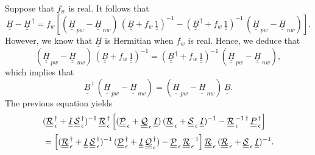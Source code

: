 \documentclass[12pt,prb,aps,notitlepage]{revtex4-1}
\begin{document}
Suppose that $f_w$ is real. It follows that
\begin{equation}
\underline{\underline{H}} -\underline{\underline{H}}^{\,\dag} = 
f_w\left[( \underline{\underline{H}}_{\,pw} - \underline{\underline{H}}_{\,nw} )\,(\underline{\underline{B}}+f_w\,\underline{\underline{1}})^{-1}- (\underline{\underline{B}}^{\,\dag}+f_w\,
\underline{\underline{1}})^{-1}\,( \underline{\underline{H}}_{\,pw} - \underline{\underline{H}}_{\,nw} )
\right].
\end{equation}
However, we know that $\underline{\underline{H}}$ is Hermitian when $f_w$ is real. Hence, we deduce that
\begin{equation}\label{e133}
 (\underline{\underline{H}}_{\,pw} - \underline{\underline{H}}_{\,nw} )\,(\underline{\underline{B}}+f_w\,\underline{\underline{1}})^{-1}= (\underline{\underline{B}}^{\,\dag}+f_w\,
\underline{\underline{1}})^{-1}\,( \underline{\underline{H}}_{\,pw} - \underline{\underline{H}}_{\,nw} ),
\end{equation}
which implies that
\begin{equation}\label{e122}
\underline{\underline{B}}^{\,\dag}\,( \underline{\underline{H}}_{\,pw} - \underline{\underline{H}}_{\,nw} )= ( \underline{\underline{H}}_{\,pw} - \underline{\underline{H}}_{\,nw} )\,\underline{\underline{B}}.
\end{equation}
The previous equation yields
\begin{align}
&(\underline{\underline{\cal R}}_{\,\epsilon}^{\,\dag}+\underline{\underline{I}}\,\underline{\underline{\cal S}}_{\,\epsilon}^{\,\dag})^{-1}\,\underline{\underline{\cal R}}_{\,\epsilon}^{\,\dag}
\left[(\underline{\underline{\cal P}}_{\,\epsilon}+\underline{\underline{\cal Q}}_{\,\epsilon}\,\underline{\underline{I}})\,(\underline{\underline{\cal R}}_{\,\epsilon}+\underline{\underline{\cal S}}_{\,\epsilon}\,\underline{\underline{I}})^{-1}
 -\underline{\underline{\cal R}}_{\,\epsilon}^{\,-1\,\dag}\,\underline{\underline{P}}_{\,\epsilon}^{\,\dag}\right]\nonumber\\[0.5ex]
 &=
  \left[(\underline{\underline{\cal R}}_{\,\epsilon}^{\,\dag}+
 \underline{\underline{I}}\,\underline{\underline{\cal S}}_{\,\epsilon}^{\,\dag})^{-1}\,(\underline{\underline{\cal P}}_{\,\epsilon}^{\,\dag}
 +\underline{\underline{I}}\,\underline{\underline{\cal Q}}_{\,\epsilon}^{\,\dag})
 -\underline{\underline{\cal P}}_{\,\epsilon}\,\underline{\underline{\cal R}}_{\,\epsilon}^{-1}\right]\underline{\underline{\cal R}}_{\,\epsilon}\,(\underline{\underline{\cal R}}_{\,\epsilon} + \underline{\underline{\cal S}}_{\,\epsilon}\,\underline{\underline{I}})^{-1}.
\end{align}
\end{document}
